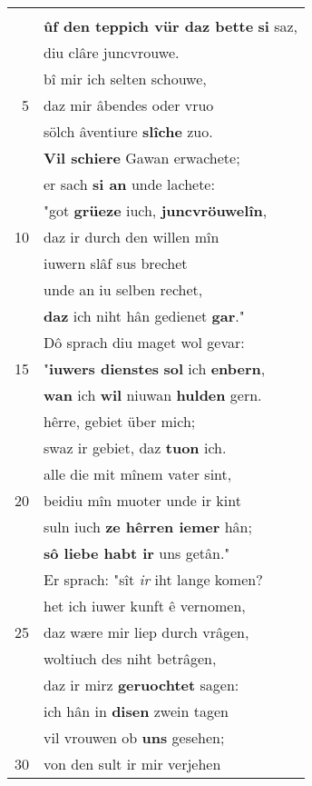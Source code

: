 \documentclass[8pt,a4paper,notitlepage]{article}
\begin{document}
\begin{table}[ht]
\begin{minipage}[t]{0.5\linewidth}
\begin{tabular}{rl}
 & \textit{\begin{large}D\end{large}}iu maget ir dienstes niht vergaz;\\ 
 & \textbf{ûf den teppich vür daz bette} \textbf{si} saz,\\ 
 & diu clâre juncvrouwe.\\ 
 & bî mir ich selten schouwe,\\ 
5 & daz mir âbendes oder vruo\\ 
 & sölch âventiure \textbf{slîche} zuo.\\ 
 & \textbf{Vil schiere} Gawan erwachete;\\ 
 & er sach \textbf{si an} unde lachete:\\ 
 & "got \textbf{grüeze} iuch, \textbf{juncvröuwelîn},\\ 
10 & daz ir durch den willen mîn\\ 
 & iuwern slâf sus brechet\\ 
 & unde an iu selben rechet,\\ 
 & \textbf{daz} ich niht hân gedienet \textbf{gar}."\\ 
 & Dô sprach diu maget wol gevar:\\ 
15 & "\textbf{iuwers dienstes} \textbf{sol} ich \textbf{enbern},\\ 
 & \textbf{wan} ich \textbf{wil} niuwan \textbf{hulden} gern.\\ 
 & hêrre, gebiet über mich;\\ 
 & swaz ir gebiet, daz \textbf{tuon} ich.\\ 
 & alle die mit mînem vater sint,\\ 
20 & beidiu mîn muoter unde ir kint\\ 
 & suln iuch \textbf{ze hêrren iemer} hân;\\ 
 & \textbf{sô liebe habt ir} uns getân."\\ 
 & Er sprach: "sît \textit{ir} iht lange komen?\\ 
 & het ich iuwer kunft ê vernomen,\\ 
25 & daz wære mir liep durch vrâgen,\\ 
 & woltiuch des niht betrâgen,\\ 
 & daz ir mirz \textbf{geruochtet} sagen:\\ 
 & ich hân in \textbf{disen} zwein tagen\\ 
 & vil vrouwen ob \textbf{uns} gesehen;\\ 
30 & von den sult ir mir verjehen\\ 

\end{tabular}
\end{minipage}
\end{table}
\end{document}
